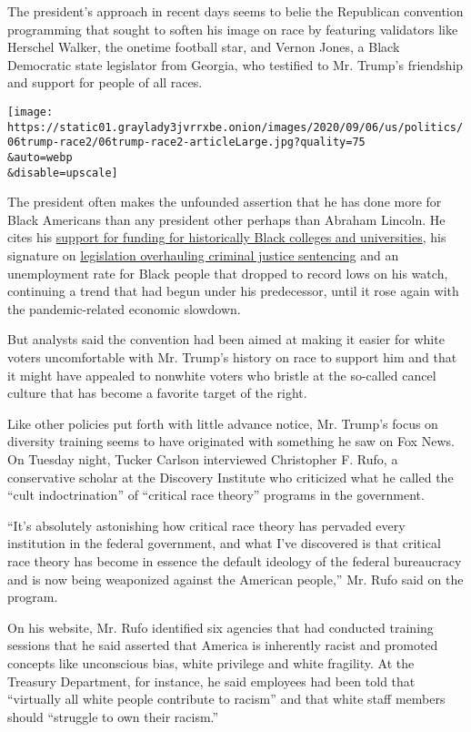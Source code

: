The president's approach in recent days seems to belie the Republican
convention programming that sought to soften his image on race by
featuring validators like Herschel Walker, the onetime football star,
and Vernon Jones, a Black Democratic state legislator from Georgia, who
testified to Mr. Trump's friendship and support for people of all races.

\texttt{[image: https://static01.graylady3jvrrxbe.onion/images/2020/09/06/us/politics/06trump-race2/06trump-race2-articleLarge.jpg?quality=75\\\&auto=webp\\\&disable=upscale]}

The president often makes the unfounded assertion that he has done more
for Black Americans than any president other perhaps than Abraham
Lincoln. He cites his
\href{https://www.nytimes3xbfgragh.onion/2019/09/10/us/politics/trump-black-colleges.html}{support
for funding for historically Black colleges and universities}, his
signature on
\href{https://www.nytimes3xbfgragh.onion/2019/04/01/us/politics/first-step-act-donald-trump.html}{legislation
overhauling criminal justice sentencing} and an unemployment rate for
Black people that dropped to record lows on his watch, continuing a
trend that had begun under his predecessor, until it rose again with the
pandemic-related economic slowdown.

But analysts said the convention had been aimed at making it easier for
white voters uncomfortable with Mr. Trump's history on race to support
him and that it might have appealed to nonwhite voters who bristle at
the so-called cancel culture that has become a favorite target of the
right.

Like other policies put forth with little advance notice, Mr. Trump's
focus on diversity training seems to have originated with something he
saw on Fox News. On Tuesday night, Tucker Carlson interviewed
Christopher F. Rufo, a conservative scholar at the Discovery Institute
who criticized what he called the ``cult indoctrination'' of ``critical
race theory'' programs in the government.

``It's absolutely astonishing how critical race theory has pervaded
every institution in the federal government, and what I've discovered is
that critical race theory has become in essence the default ideology of
the federal bureaucracy and is now being weaponized against the American
people,'' Mr. Rufo said on the program.

On his website, Mr. Rufo identified six agencies that had conducted
training sessions that he said asserted that America is inherently
racist and promoted concepts like unconscious bias, white privilege and
white fragility. At the Treasury Department, for instance, he said
employees had been told that ``virtually all white people contribute to
racism'' and that white staff members should ``struggle to own their
racism.''

